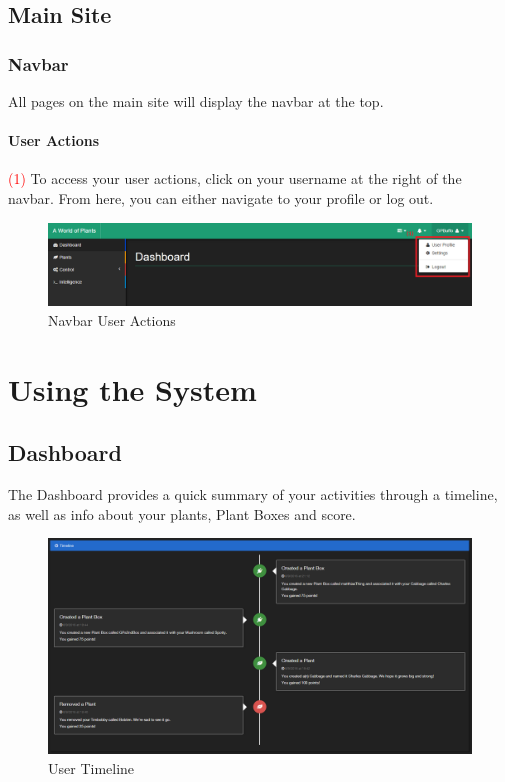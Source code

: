 \documentclass{article}
\begin{document}
\subsection{Main Site}
	\subsubsection{Navbar}
	All pages on the main site will display the navbar at the top.
		\paragraph{User Actions}
		\textcolor{red}{(1)} To access your user actions, click on your username at the right of the navbar. From here, you can either navigate to your profile or log out.
		\begin{figure}[H]
			\includegraphics[width=\textwidth]{../images/UserManual/navbar-user-actions.PNG}
			\caption{Navbar User Actions}
		\end{figure}

\section{Using the System}
	\subsection{Dashboard}
	The Dashboard provides a quick summary of your activities through a timeline, as well as info about your plants, Plant Boxes and score.
	\begin{figure}[H]
		\includegraphics[width=\textwidth]{../images/UserManual/timeline.png}
		\caption{User Timeline}
	\end{figure}
\end{document}
